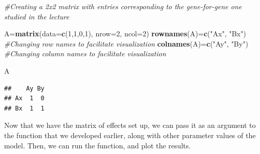 \documentclass[
]{book}
\newenvironment{Shaded}{\begin{snugshade}}{\end{snugshade}}
\newcommand{\AttributeTok}[1]{\textcolor[rgb]{0.13,0.29,0.53}{#1}}
\newcommand{\CommentTok}[1]{\textcolor[rgb]{0.56,0.35,0.01}{\textit{#1}}}
\newcommand{\DecValTok}[1]{\textcolor[rgb]{0.00,0.00,0.81}{#1}}
\newcommand{\FunctionTok}[1]{\textcolor[rgb]{0.13,0.29,0.53}{\textbf{#1}}}
\newcommand{\NormalTok}[1]{#1}
\newcommand{\OtherTok}[1]{\textcolor[rgb]{0.56,0.35,0.01}{#1}}
\newcommand{\StringTok}[1]{\textcolor[rgb]{0.31,0.60,0.02}{#1}}
\begin{document}
\begin{Shaded}
\begin{Highlighting}[]
\CommentTok{\#Creating a 2x2 matrix with entries corresponding to the gene{-}for{-}gene one studied in the lecture}

\NormalTok{A}\OtherTok{=}\FunctionTok{matrix}\NormalTok{(}\AttributeTok{data=}\FunctionTok{c}\NormalTok{(}\DecValTok{1}\NormalTok{,}\DecValTok{1}\NormalTok{,}\DecValTok{0}\NormalTok{,}\DecValTok{1}\NormalTok{), }\AttributeTok{nrow=}\DecValTok{2}\NormalTok{, }\AttributeTok{ncol=}\DecValTok{2}\NormalTok{)}
\FunctionTok{rownames}\NormalTok{(A)}\OtherTok{=}\FunctionTok{c}\NormalTok{(}\StringTok{"Ax"}\NormalTok{, }\StringTok{"Bx"}\NormalTok{) }\CommentTok{\#Changing row names to facilitate visualization}
\FunctionTok{colnames}\NormalTok{(A)}\OtherTok{=}\FunctionTok{c}\NormalTok{(}\StringTok{"Ay"}\NormalTok{, }\StringTok{"By"}\NormalTok{) }\CommentTok{\#Changing column names to facilitate visualization}

\NormalTok{A}
\end{Highlighting}
\end{Shaded}

\begin{verbatim}
##    Ay By
## Ax  1  0
## Bx  1  1
\end{verbatim}

Now that we have the matrix of effects set up, we can pass it as an argument to the function that we developed earlier, along with other parameter values of the model. Then, we can run the function, and plot the results.
\end{document}
